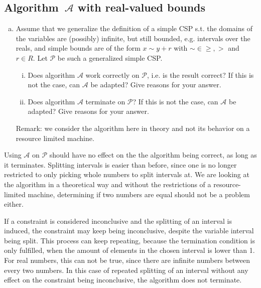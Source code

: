 \subsection{Algorithm~$\mathcal{A}$ with real-valued bounds}

\begin{enumerate}[(d)]
    \item Assume that we generalize the definition of a simple CSP s.t. the domains of the variables are (possibly) infinite, but still bounded, e.g. intervals over the reals, and simple bounds are of the form $x \sim y + r$ with $\sim \in {\geq , >}$ and $r \in R$. Let $\mathcal{P}$ be such a generalized simple CSP.
    \begin{enumerate}[i.]
        \item Does algorithm $\mathcal{A}$ work correctly on $\mathcal{P}$, i.e. is the result correct? If this is not the case, can $\mathcal{A}$ be adapted? Give reasons for your answer.
        \item Does algorithm $\mathcal{A}$ terminate on $\mathcal{P}$? If this is not the case, can $\mathcal{A}$ be adapted? Give reasons for your answer.
    \end{enumerate}
    Remark: we consider the algorithm here in theory and not its behavior on a resource limited machine.
\end{enumerate}

Using $\mathcal{A}$ on $\mathcal{P}$ should have no effect on the the algorithm being correct, as long as it terminates. Splitting intervals is easier than before, since one is no longer restricted to only picking whole numbers to split intervals at. We are looking at the algorithm in a theoretical way and without the restrictions of a resource-limited machine, determining if two numbers are equal should not be a problem either. 

If a constraint is considered inconclusive and the splitting of an interval is induced, the constraint may keep being inconclusive, despite the variable interval being split. This process can keep repeating, because the termination condition is only fulfilled, when the amount of elements in the chosen interval is lower than 1. For real numbers, this can not be true, since there are infinite numbers between every two numbers. In this case of repeated splitting of an interval without any effect on the constraint being inconclusive, the algorithm does not terminate.


